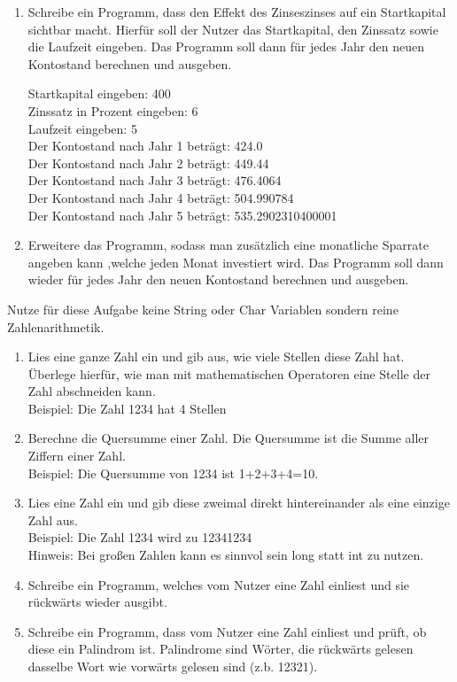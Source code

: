\documentclass{../../sheet}
\begin{document}
\newpage
{}
\begin{enumerate}
    \item Schreibe ein Programm, dass den Effekt des Zinseszinses auf ein Startkapital sichtbar macht. Hierfür soll der Nutzer das Startkapital, den Zinssatz sowie die Laufzeit eingeben. Das Programm soll dann für jedes Jahr den neuen Kontostand berechnen und ausgeben. 
        \begin{ausgabe}
            Startkapital eingeben: 400\\
            Zinssatz in Prozent eingeben: 6\\
            Laufzeit eingeben: 5\\
            Der Kontostand nach Jahr 1 beträgt: 424.0\\
            Der Kontostand nach Jahr 2 beträgt: 449.44\\
            Der Kontostand nach Jahr 3 beträgt: 476.4064\\
            Der Kontostand nach Jahr 4 beträgt: 504.990784\\
            Der Kontostand nach Jahr 5 beträgt: 535.2902310400001\\
        \end{ausgabe}
    \item Erweitere das Programm, sodass man zusätzlich eine monatliche Sparrate angeben kann ,welche jeden Monat investiert wird. Das Programm soll dann wieder für jedes Jahr den neuen Kontostand berechnen und ausgeben.
\end{enumerate}


\newpage
{}
Nutze für diese Aufgabe keine String oder Char Variablen sondern reine Zahlenarithmetik.
\begin{enumerate}
    \item Lies eine ganze Zahl ein und gib aus, wie viele Stellen diese Zahl hat. Überlege hierfür, wie man mit mathematischen Operatoren eine Stelle der Zahl abschneiden kann.\\ Beispiel: Die Zahl 1234 hat 4 Stellen
    \item Berechne die Quersumme einer Zahl. Die Quersumme ist die Summe aller Ziffern einer Zahl. \\Beispiel: Die Quersumme von 1234 ist 1+2+3+4=10.
    \item Lies eine Zahl ein und gib diese zweimal direkt hintereinander als eine einzige Zahl aus.\\ Beispiel: Die Zahl 1234 wird zu 12341234 \\ Hinweis: Bei großen Zahlen kann es sinnvol sein long statt int zu nutzen.
    \item Schreibe ein Programm, welches vom Nutzer eine Zahl einliest und sie rückwärts wieder ausgibt.
    \item Schreibe ein Programm, dass vom Nutzer eine Zahl einliest und prüft, ob diese ein Palindrom ist. Palindrome sind Wörter, die rückwärts gelesen dasselbe Wort wie vorwärts gelesen sind (z.b. 12321).
\end{enumerate}
\end{document}
